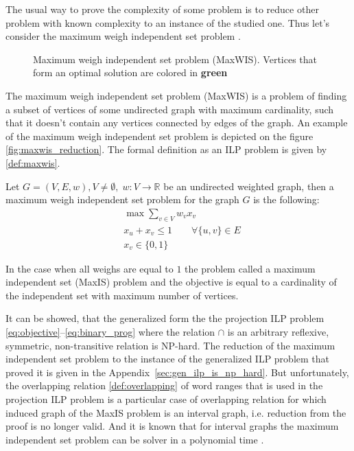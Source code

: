 The usual way to prove the complexity of some problem is to reduce other problem with known complexity to
an instance of the studied one. Thus let's consider the maximum weigh independent set problem \cite{pemmaraju2003computational}.

\begin{figure}[ht]
  \centering
  \caption{Maximum weigh independent set problem (MaxWIS). Vertices that form an optimal solution are colored in \textbf{\textcolor{green!50}{green}}}
  \label{fig:maxwis}
\end{figure}

The maximum weigh independent set problem (MaxWIS) is a problem of finding a subset of vertices of some undirected
graph with maximum cardinality, such that it doesn't contain any vertices connected by edges of the graph.
An example of the maximum weigh independent set problem is depicted on the figure \ref{fig:maxwis_reduction}.
The formal definition as an ILP problem is given by \ref{def:maxwis}.
\begin{definition}[MaxWIS] \label{def:maxwis}
  Let \( G=(V, E, w), V \neq \emptyset, \; w: V \rightarrow \mathbb{R} \) be an undirected weighted graph, then a maximum weigh
  independent set problem for the graph \( G \) is the following:
  \begin{align*}
    & \max \sum\limits_{v \in V} w_v x_v                               \\
    & x_u + x_v \leq 1               \qquad \forall \{u, v\} \in E \\
    & x_v \in \{0, 1\}
  \end{align*}
\end{definition}

In the case when all weighs are equal to \( 1 \) the problem called a maximum independent set (MaxIS) problem and
the objective is equal to a cardinality of the independent set with maximum number of vertices.

It can be showed, that the generalized form the the projection ILP problem
\eqref{eq:objective}--\eqref{eq:binary_prog} where the relation \( \cap \) is an arbitrary
reflexive, symmetric, non-transitive relation is NP-hard. The reduction of the maximum independent
set problem to the instance of the generalized ILP problem that proved it is given in the
Appendix~\ref{sec:gen_ilp_is_np_hard}. But unfortunately, the overlapping relation \ref{def:overlapping}
of word ranges that is used in the projection ILP problem is a particular case of overlapping relation
for which induced graph of the MaxIS problem is an interval graph, i.e. reduction from the proof
is no longer valid. And it is known that for interval graphs the maximum independent
set problem can be solver in a polynomial time \cite{bhattacharya2014maximum}.

